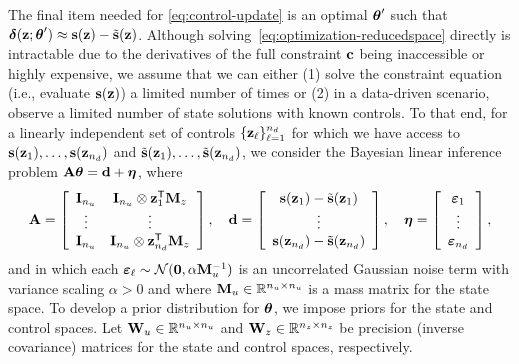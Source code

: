 The final item needed for \cref{eq:control-update} is an optimal $\boldsymbol{\theta}'$ such that $\boldsymbol{\delta}(\mathbf{z};\boldsymbol{\theta}') \approx \mathbf{s}(\mathbf{z}) - \tilde{\mathbf{s}}(\mathbf{z})$.
Although solving~\cref{eq:optimization-reducedspace} directly is intractable due to the derivatives of the full constraint $\mathbf{c}$ being inaccessible or highly expensive, we assume that we can either (1) solve the constraint equation (i.e., evaluate $\mathbf{s}(\mathbf{z})$) a limited number of times or (2) in a data-driven scenario, observe a limited number of state solutions with known controls.
To that end, for a linearly independent set of controls $\{\mathbf{z}_{\ell}\}_{\ell=1}^{n_d}$ for which we have access to $\mathbf{s}(\mathbf{z}_1),\ldots,\mathbf{s}(\mathbf{z}_{n_d})$ and $\tilde{\mathbf{s}}(\mathbf{z}_1),\ldots,\tilde{\mathbf{s}}(\mathbf{z}_{n_d})$, we consider the Bayesian linear inference problem $\mathbf{A}\boldsymbol{\theta} = \mathbf{d} + \boldsymbol{\eta}$, where
\begin{align}
    \label{eq:bayesian-inference}
    \mathbf{A} =
    \left[\begin{array}{cc}
        \mathbf{I}_{n_u} & \mathbf{I}_{n_u}\otimes\mathbf{z}_1^{\mathsf{T}}\mathbf{M}_z\\
        \vdots & \vdots \\
        \mathbf{I}_{n_u} & \mathbf{I}_{n_u}\otimes\mathbf{z}_{n_d}^{\mathsf{T}}\mathbf{M}_z
    \end{array}\right],
    \quad
    \mathbf{d}
    = \left[\begin{array}{c}
        \mathbf{s}(\mathbf{z}_1) - \tilde{\mathbf{s}}(\mathbf{z}_1)
        \\ \vdots \\
        \mathbf{s}(\mathbf{z}_{n_d}) - \tilde{\mathbf{s}}(\mathbf{z}_{n_d})
    \end{array}\right],
    \quad
    \boldsymbol{\eta}
    = \left[\begin{array}{c}
        \boldsymbol{\varepsilon}_1
        \\ \vdots \\
        \boldsymbol{\varepsilon}_{n_d}
    \end{array}\right],
\end{align}
and in which each $\boldsymbol{\varepsilon}_{\ell}\sim\mathcal{N}(\mathbf{0}, \alpha\mathbf{M}_u^{-1})$ is an uncorrelated Gaussian noise term with variance scaling $\alpha > 0$ and where $\mathbf{M}_u\in\mathbb{R}^{n_u\times n_u}$ is a mass matrix for the state space.
To develop a prior distribution for $\boldsymbol{\theta}$, we impose priors for the state and control spaces.
Let $\mathbf{W}_u\in\mathbb{R}^{n_u\times n_u}$ and $\mathbf{W}_z\in\mathbb{R}^{n_z\times n_z}$ be precision (inverse covariance) matrices for the state and control spaces, respectively.
